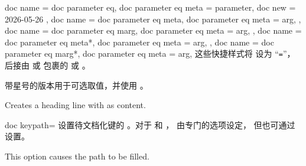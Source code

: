 \begin{docTcbKeys}[doc description = 样式]
  {
    {
      doc name = doc parameter eq,
      doc parameter eq meta = parameter,
      doc new  = 2026-05-26
    },
    {
      doc name = doc parameter eq meta,
      doc parameter eq meta = arg,
    },
    {
      doc name = doc parameter eq marg,
      doc parameter eq meta = arg,
    },
    {
      doc name = doc parameter eq meta*,
      doc parameter eq meta = arg,
    },
    {
      doc name = doc parameter eq marg*,
      doc parameter eq meta = arg,
    }
  }
这些快捷样式将  设为 \enquote{\texttt{=}}，
后接由  或  包裹的  或 。\par
带星号的版本用于可选取值，并使用 。


\begin{dispExample}
\begin{docKeys}[
    doc name              = /foo/footitle,
    doc parameter eq meta = text,
    doc description init empty
  ]{}
  Creates a heading line with  as content.
\end{docKeys}
\end{dispExample}
\end{docTcbKeys}


\begin{docTcbKey}[][doc new={2020-04-22}]{doc keypath}{=}{\tcbdocdescInitEmpty}
  设置待文档化键的 。对于 
  和 ， 由专门的选项设定，
  但也可通过  设置。
\begin{dispExample}
\begin{docKeys}[
    doc no index,  %
    doc keypath            = tikz,
    doc name               = fill,
    doc parameter eq meta* = color,
    doc description        = default is scope's color setting,
  ] {}
  This option causes the path to be filled.
\end{docKeys}
\end{dispExample}
\end{docTcbKey}

\clearpage

